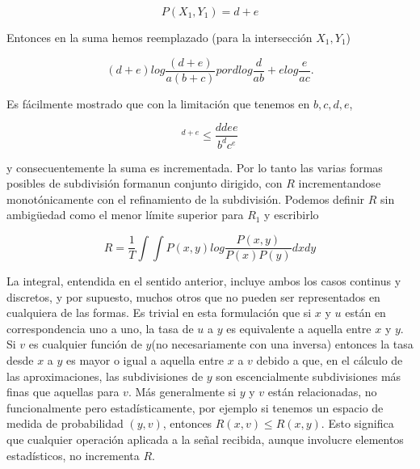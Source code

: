 \begin{equation} P(X_{1}, Y_{1}) = d + e \end{equation}
					
Entonces en la suma hemos reemplazado (para la intersecci\'on $X_{1}, Y_{1}$)

\begin{equation} (d + e) log \frac{(d + e)}{a(b + c)}   por  d log \frac{d}{ab} + e log \frac{e}{ac}. \end{equation}
			
Es f\'acilmente mostrado que con la limitaci\'on que tenemos en $b, c, d, e$,

\begin{equation} [\frac{d + e}{b + c}]^{d+e}  \leq \frac{d{d} e{e}}{b^{d} c^{e}} \end{equation}
				
y consecuentemente la suma es incrementada. Por lo tanto las varias formas posibles
de subdivisi\'on formanun conjunto dirigido, con $R$ incrementandose monot\'onicamente
con el refinamiento de la subdivisi\'on. Podemos definir $R$ sin ambigüedad como el
menor l\'imite superior para $R_{1}$ y escribirlo

\begin{equation} R = \frac{1}{T} \int \int P(x,y) log \frac{P(x,y)}{P(x) P(y)} dx dy \end{equation}
			
La integral, entendida en el sentido anterior, incluye ambos los casos continus y 
discretos, y por supuesto, muchos otros que no pueden ser representados en cualquiera
de las formas. Es trivial en esta formulaci\'on que si $x$ y $u$ est\'an en correspondencia
uno a uno, la tasa de $u$ a $y$ es equivalente a aquella entre $x$ y $y$. Si $v$ es cualquier
funci\'on de $y$(no necesariamente con una inversa) entonces la tasa desde $x$ a $y$ es mayor
o igual a aquella entre $x$ a $v$ debido a que, en el c\'alculo de las aproximaciones,
las subdivisiones de $y$ son escencialmente subdivisiones m\'as finas que aquellas para $v$.
M\'as generalmente si $y$ y $v$ est\'an relacionadas, no funcionalmente pero estad\'isticamente,
por ejemplo si tenemos un espacio de medida de probabilidad $(y, v)$, entonces 
$R(x,v) \leq R(x,y)$. Esto significa que cualquier operaci\'on aplicada a la señal recibida,
aunque involucre elementos estad\'isticos, no incrementa $R$.

